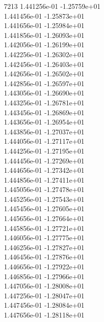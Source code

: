 7213	1.441256e-01	-1.25759e+01	\\ 	1.441456e-01	-1.25873e+01	\\ 	1.441656e-01	-1.25984e+01	\\ 	1.441856e-01	-1.26093e+01	\\ 	1.442056e-01	-1.26199e+01	\\ 	1.442256e-01	-1.26302e+01	\\ 	1.442456e-01	-1.26403e+01	\\ 	1.442656e-01	-1.26502e+01	\\ 	1.442856e-01	-1.26597e+01	\\ 	1.443056e-01	-1.26690e+01	\\ 	1.443256e-01	-1.26781e+01	\\ 	1.443456e-01	-1.26869e+01	\\ 	1.443656e-01	-1.26954e+01	\\ 	1.443856e-01	-1.27037e+01	\\ 	1.444056e-01	-1.27117e+01	\\ 	1.444256e-01	-1.27195e+01	\\ 	1.444456e-01	-1.27269e+01	\\ 	1.444656e-01	-1.27342e+01	\\ 	1.444856e-01	-1.27411e+01	\\ 	1.445056e-01	-1.27478e+01	\\ 	1.445256e-01	-1.27543e+01	\\ 	1.445456e-01	-1.27605e+01	\\ 	1.445656e-01	-1.27664e+01	\\ 	1.445856e-01	-1.27721e+01	\\ 	1.446056e-01	-1.27775e+01	\\ 	1.446256e-01	-1.27827e+01	\\ 	1.446456e-01	-1.27876e+01	\\ 	1.446656e-01	-1.27922e+01	\\ 	1.446856e-01	-1.27966e+01	\\ 	1.447056e-01	-1.28008e+01	\\ 	1.447256e-01	-1.28047e+01	\\ 	1.447456e-01	-1.28084e+01	\\ 	1.447656e-01	-1.28118e+01	\\ \hline

